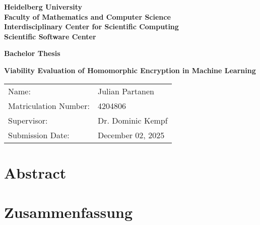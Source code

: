 \documentclass[
     12pt,         %
     a4paper,      %
     BCOR=10mm,     %
     DIV=14,        %
     ]{scrreprt}
\begin{document}
\begin{titlepage}


\vspace*{1cm}
\begin{center}
\vspace*{3cm}
\textbf{
\Large Heidelberg University\\
\smallskip
\Large Faculty of Mathematics and Computer Science\\
\smallskip
\Large Interdisciplinary Center for Scientific Computing\\
\smallskip
\Large Scientific Software Center\\
\smallskip
}

\vspace{3cm}

\textbf{\large Bachelor Thesis}

\vspace{0.5\baselineskip}
{\huge
\textbf{Viability Evaluation of Homomorphic Encryption in Machine Learning}
}
\end{center}

\vfill

{\large
\begin{tabular}[l]{ll}
Name: & Julian Partanen\\
Matriculation Number: & 4204806\\
Supervisor: & Dr. Dominic Kempf\\
Submission Date: & December 02, 2025
\end{tabular}
}

\end{titlepage}

\chapter*{Abstract}

\newpage

\chapter*{Zusammenfassung}

\newpage

\tableofcontents
\cleardoublepage
{}

\end{document}

